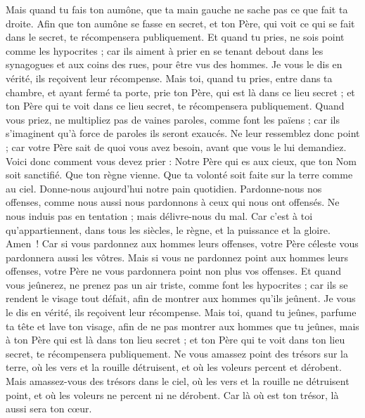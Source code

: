 \begin{multicols}{2}
Mais quand tu fais ton aumône, que ta main gauche ne sache pas ce que fait ta droite.
Afin que ton aumône se fasse en secret, et ton Père, qui voit ce qui se fait dans le secret, te récompensera publiquement.
Et quand tu pries, ne sois point comme les hypocrites ; car ils aiment à prier en se tenant debout dans les synagogues et aux coins des rues, pour être vus des hommes. Je vous le dis en vérité, ils reçoivent leur récompense.
Mais toi, quand tu pries, entre dans ta chambre, et ayant fermé ta porte, prie ton Père, qui est là dans ce lieu secret ; et ton Père qui te voit dans ce lieu secret, te récompensera publiquement.
Quand vous priez, ne multipliez pas de vaines paroles, comme font les païens ; car ils s'imaginent qu’à force de paroles ils seront exaucés.
Ne leur ressemblez donc point ; car votre Père sait de quoi vous avez besoin, avant que vous le lui demandiez.
Voici donc comment vous devez prier : Notre Père qui es aux cieux, que ton Nom soit sanctifié.
Que ton règne vienne. Que ta volonté soit faite sur la terre comme au ciel.
Donne-nous aujourd'hui notre pain quotidien.
Pardonne-nous nos offenses, comme nous aussi nous pardonnons à ceux qui nous ont offensés.
Ne nous induis pas en tentation ; mais délivre-nous du mal. Car c’est à toi qu’appartiennent, dans tous les siècles, le règne, et la puissance et la gloire. Amen !
Car si vous pardonnez aux hommes leurs offenses, votre Père céleste vous pardonnera aussi les vôtres.
Mais si vous ne pardonnez point aux hommes leurs offenses, votre Père ne vous pardonnera point non plus vos offenses.
Et quand vous jeûnerez, ne prenez pas un air triste, comme font les hypocrites ; car ils se rendent le visage tout défait, afin de montrer aux hommes qu'ils jeûnent. Je vous le dis en vérité, ils reçoivent leur récompense.
Mais toi, quand tu jeûnes, parfume ta tête et lave ton visage,
afin de ne pas montrer aux hommes que tu jeûnes, mais à ton Père qui est là dans ton lieu secret ; et ton Père qui te voit dans ton lieu secret, te récompensera publiquement.
Ne vous amassez point des trésors sur la terre, où les vers et la rouille détruisent, et où les voleurs percent et dérobent.
Mais amassez-vous des trésors dans le ciel, où les vers et la rouille ne détruisent point, et où les voleurs ne percent ni ne dérobent.
Car là où est ton trésor, là aussi sera ton cœur.

\end{multicols}
